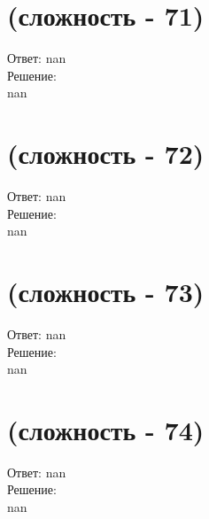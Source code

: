\documentclass[a4paper,11pt]{article}%
\begin{document}
%
\section{(сложность {-} 71)}%
\label{sec:( {-} 71)}%
\hspace{3ex} Ответ: nan \\%
%
\hspace*{3ex} Решение: \\%
nan

%
\section{(сложность {-} 72)}%
\label{sec:( {-} 72)}%
\hspace{3ex} Ответ: nan \\%
%
\hspace*{3ex} Решение: \\%
nan

%
\section{(сложность {-} 73)}%
\label{sec:( {-} 73)}%
\hspace{3ex} Ответ: nan \\%
%
\hspace*{3ex} Решение: \\%
nan

%
\section{(сложность {-} 74)}%
\label{sec:( {-} 74)}%
\hspace{3ex} Ответ: nan \\%
%
\hspace*{3ex} Решение: \\%
nan

%
\end{document}
